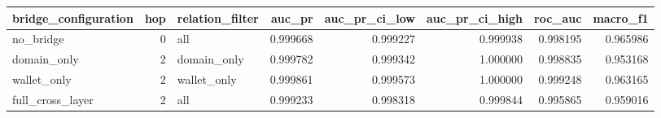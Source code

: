\begin{tabular}{lrlrrrrr}
\toprule
bridge_configuration & hop & relation_filter & auc_pr & auc_pr_ci_low & auc_pr_ci_high & roc_auc & macro_f1 \\
\midrule
no_bridge & 0 & all & 0.999668 & 0.999227 & 0.999938 & 0.998195 & 0.965986 \\
domain_only & 2 & domain_only & 0.999782 & 0.999342 & 1.000000 & 0.998835 & 0.953168 \\
wallet_only & 2 & wallet_only & 0.999861 & 0.999573 & 1.000000 & 0.999248 & 0.963165 \\
full_cross_layer & 2 & all & 0.999233 & 0.998318 & 0.999844 & 0.995865 & 0.959016 \\
\bottomrule
\end{tabular}
